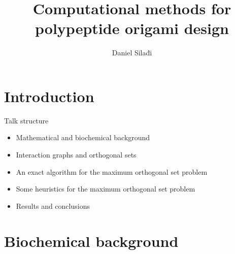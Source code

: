 \documentclass{beamer}
\title{Computational methods for polypeptide origami design}
\author{Daniel Silađi}
\institute{Mentor: Andrej Brodnik\\
Co-mentor: Rok Požar}
\date{}
\theoremstyle{plain}
\theoremstyle{remark}
\begin{document}
\frame{\titlepage}

\section{Introduction}

\begin{frame}{Talk structure}
	\begin{itemize}
		\item Mathematical and biochemical background
		\item Interaction graphs and orthogonal sets
		\item An exact algorithm for the maximum orthogonal set problem
		\item Some heuristics for the maximum orthogonal set problem
		\item Results and conclusions
	\end{itemize}
\end{frame}

\section{Biochemical background}
\end{document}
